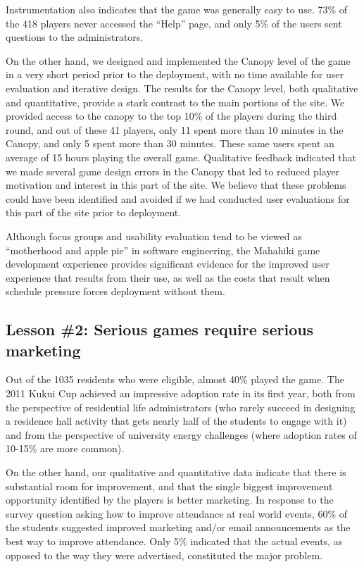 \documentclass{acm_proc_article-sp}
\begin{document}
Instrumentation also indicates that the game was generally easy to
use. 73\% of the 418 players never accessed the ``Help'' page, and only 5\%
of the users sent questions to the administrators.

On the other hand, we designed and implemented the Can\-opy level of the
game in a very short period prior to the deployment, with no time available
for user evaluation and iterative design.  The results for the Canopy
level, both qualitative and quantitative, provide a stark contrast to the
main portions of the site.  We provided access to the canopy to the top
10\% of the players during the third round, and out of these 41 players,
only 11 spent more than 10 minutes in the Canopy, and only 5 spent more
than 30 minutes. These same users spent an average of 15 hours playing the
overall game.  Qualitative feedback indicated that we made several game
design errors in the Canopy that led to reduced player motivation and
interest in this part of the site.  We believe that these problems could
have been identified and avoided if we had conducted user evaluations for
this part of the site prior to deployment.

Although focus groups and usability evaluation tend to be viewed as
``motherhood and apple pie'' in software engineering, the Mahahiki game
development experience provides significant evidence for the improved user
experience that results from their use, as well as the costs that result
when schedule pressure forces deployment without them.

\subsection{Lesson \#2: Serious games require serious marketing}

Out of the 1035 residents who were eligible, almost 40\% played the game. The
2011 Kukui Cup achieved an impressive adoption rate in its first year, both
from the perspective of residential life administrators (who rarely succeed in
designing a residence hall activity that gets nearly half of the students to
engage with it) and from the perspective of university energy challenges (where
adoption rates of 10-15\% are more common).

On the other hand, our qualitative and quantitative data indicate that
there is substantial room for improvement, and that the single biggest
improvement opportunity identified by the players is better marketing.  In
response to the survey question asking how to improve attendance at real
world events, 60\% of the students suggested improved marketing and/or email
announcements as the best way to improve attendance.  Only 5\% indicated
that the actual events, as opposed to the way they were advertised,
constituted the major problem.
\end{document}
